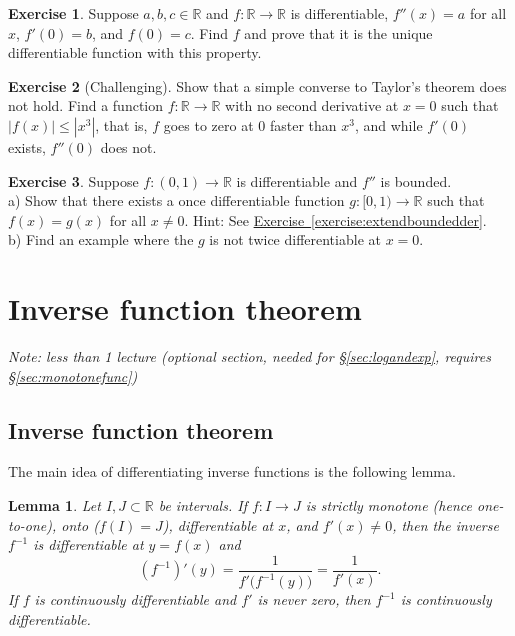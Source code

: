 \documentclass[12pt]{book}
\newcommand{\abs}[1]{\left\lvert {#1} \right\rvert}
\newcommand{\R}{{\mathbb{R}}}
\newcommand{\sectionnotes}[1]{\noindent \emph{Note: #1} \medskip \par}
\newcommand{\sectionnewpage}{\clearpage}
\theoremstyle{plain}
\newtheorem{lemma}[thm]{Lemma}
\theoremstyle{remark}
\theoremstyle{definition}
\theoremstyle{exercise}
\newtheorem{exercise}{Exercise}[section]
\theoremstyle{example}
\newcommand{\sectionref}[1]{\hyperref[#1]{\S\ref*{#1}}}
\newcommand{\exerciseref}[1]{\hyperref[#1]{Exercise~\ref*{#1}}}
\begin{document}
\begin{exercise}
Suppose $a,b,c \in \R$ and $f \colon \R \to \R$ is differentiable,
$f''(x) = a$ for all $x$, $f'(0) = b$, and $f(0) = c$.  Find $f$ and prove that 
it is the unique differentiable function with this property.
\end{exercise}

\begin{exercise}[Challenging]
Show that a simple converse to Taylor's theorem does not hold.
Find a function $f \colon \R \to \R$ with no second derivative at $x=0$ such that
$\abs{f(x)} \leq \abs{x^3}$, that is, $f$ goes to zero at 0 faster than $x^3$, and
while $f'(0)$ exists, $f''(0)$ does not.
\end{exercise}

\begin{exercise} \label{exercise:extendboundedder2}
Suppose $f \colon (0,1) \to \R$ is differentiable and $f''$
is bounded.\\
a) Show that there exists a once differentiable function $g \colon [0,1) \to \R$
such that $f(x) = g(x)$ for all $x \not= 0$.  Hint: 
See
\exerciseref{exercise:extendboundedder}.
\\
b) Find an example where the $g$ is not twice differentiable at $x=0$.
\end{exercise}


\sectionnewpage
\section{Inverse function theorem}
\label{sec:ift}

\sectionnotes{less than 1 lecture (optional section, needed for
\sectionref{sec:logandexp}, requires 
\sectionref{sec:monotonefunc})}

\subsection{Inverse function theorem}

The main idea of differentiating inverse functions is the following lemma.

\begin{lemma} \label{lemma:ift}
Let $I,J \subset \R$ be intervals.
If $f \colon I \to J$ is strictly monotone (hence one-to-one),
onto ($f(I) = J$),
differentiable at $x$, and $f'(x) \not= 0$,
then the inverse 
$f^{-1}$ is differentiable at $y = f(x)$ and
\begin{equation*}
(f^{-1})'(y) = \frac{1}{f'\bigl( f^{-1}(y) \bigr)} = \frac{1}{f'(x)} .
\end{equation*}
If $f$ is continuously differentiable and $f'$ is never zero, then $f^{-1}$
is continuously differentiable.
\end{lemma}
\end{document}
